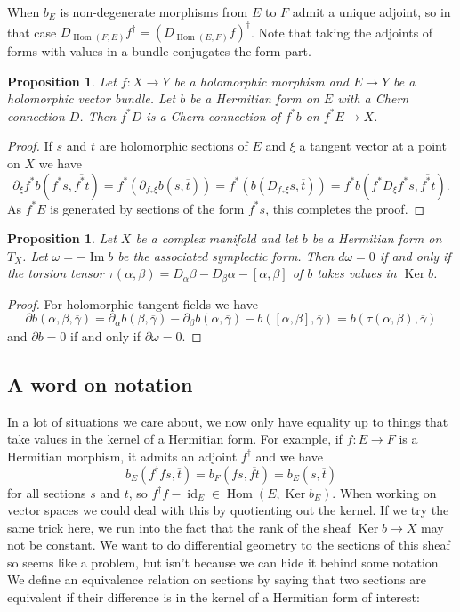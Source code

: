 \documentclass[10pt,a4paper]{amsart}
\newtheorem{prop}[theo]{Proposition}
\theoremstyle{definition}
\def\ov#1{\overline{#1}}
\DeclareMathOperator{\Ker}{Ker}
\DeclareMathOperator{\Hom}{Hom}
\DeclareMathOperator{\id}{id}
\begin{document}
When $b_E$ is non-degenerate morphisms from $E$ to $F$ admit a unique adjoint, so in that case $D_{\Hom(F,E)}f^\dagger = (D_{\Hom(E,F)}f)^\dagger$. Note that taking the adjoints of forms with values in a bundle conjugates the form part.



\begin{prop}
Let $f : X \to Y$ be a holomorphic morphism and $E \to Y$ be a holomorphic vector bundle.
Let $b$ be a Hermitian form on $E$ with a Chern connection $D$.
Then $f^{*}D$ is a Chern connection of $f^{*}b$ on $f^{*}E \to X$.
\end{prop}

\begin{proof}
If $s$ and $t$ are holomorphic sections of $E$ and $\xi$ a tangent vector at a point on $X$ we have
\[
\partial_{\xi} f^{*} b(f^{*}s, \overline{f^{*}t})
= f^{*}(\partial_{f_{*}\xi} b(s, \overline t))
= f^{*}(b(D_{f_{*}\xi}s, \overline{t}))
= f^{*}b(f^{*}D_{\xi} f^{*}s, \overline{f^{*}t}).
\]
As $f^{*}E$ is generated by sections of the form $f^{*}s$, this completes the proof.
\end{proof}



\begin{prop}
Let $X$ be a complex manifold and let $b$ be a Hermitian form on $T_X$.
Let $\omega = -\operatorname{Im} b$ be the associated symplectic form.
Then $d \omega = 0$ if and only if the torsion tensor $\tau(\alpha,\beta) = D_\alpha \beta - D_\beta \alpha - [\alpha, \beta]$ of $b$ takes values in $\Ker b$.
\end{prop}

\begin{proof}
For holomorphic tangent fields we have
\[
\partial b (\alpha, \beta, \ov \gamma)
= \partial_\alpha b(\beta, \ov\gamma)
- \partial_\beta b(\alpha, \ov\gamma)
- b([\alpha,\beta], \ov\gamma)
= b(\tau(\alpha,\beta), \ov\gamma)
\]
and $\partial b = 0$ if and only if $\partial \omega = 0$.
\end{proof}



\subsection*{A word on notation}


In a lot of situations we care about, we now only have equality up to things that take values in the kernel of a Hermitian form. For example, if $f : E \to F$ is a Hermitian morphism, it admits an adjoint $f^\dagger$ and we have
\[
b_E(f^\dagger f s, \ov t)
= b_F(f s, \ov{f t})
= b_E(s, \ov t)
\]
for all sections $s$ and $t$, so $f^\dagger f - \id_E \in \Hom(E, \Ker b_E)$.
When working on vector spaces we could deal with this by quotienting out the
kernel. If we try the same trick here, we run into the fact that the rank of
the sheaf $\Ker b \to X$ may not be constant. We want to do differential
geometry to the sections of this sheaf so seems like a problem, but isn't
because we can hide it behind some notation.
We define an equivalence relation on sections by saying that two sections are
equivalent if their difference is in the kernel of a Hermitian form of
interest:
\end{document}
